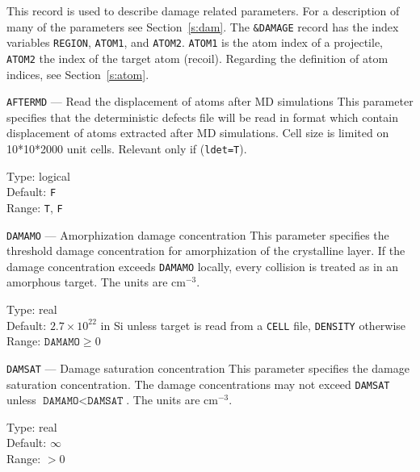 This record is used to describe damage related parameters. For a description of
many of the parameters see Section~\ref{s:dam}. The \texttt{\&DAMAGE} record has
the index variables \texttt{REGION}, \texttt{ATOM1}, and \texttt{ATOM2}.
\texttt{ATOM1} is the atom index of a projectile, \texttt{ATOM2} the index of the target atom
(recoil). Regarding the definition of atom indices, see Section~\ref{s:atom}.

\ifprivate
\begin{keydescription}{\texttt{AFTERMD} --- Read the displacement of atoms
after MD simulations}
%
  This parameter specifies that the deterministic defects file will be read 
  in format which contain displacement of atoms extracted after MD simulations. 
  Cell size  is limited on 10*10*2000 unit cells. Relevant only if  (\texttt{ldet=T}).
 
 \begin{keytab} 
 Type: \> logical \\ 
 Default: \> \texttt{F} \\ 
 Range: \>  \texttt{T}, \texttt{F}
  \end{keytab}
\end{keydescription}
\fi

\begin{keydescription}{\texttt{DAMAMO} --- Amorphization damage 
    concentration}
%
  This parameter specifies the threshold damage concentration for
  amorphization of the crystalline layer. If the damage concentration
  exceeds \texttt{DAMAMO} locally, every collision is treated as in an
  amorphous target. The units are cm$^{-3}$.
  \begin{keytab}
    Type:    \> real \\
    Default: \> $2.7 \times 10^{22}$ in Si unless target is read from a \texttt{CELL} file, 
                \texttt{DENSITY} otherwise \\
    Range:   \> $\texttt{DAMAMO} \ge 0$
  \end{keytab}
\end{keydescription}

\begin{keydescription}{\texttt{DAMSAT} --- Damage saturation concentration}
%
  This parameter specifies the damage saturation concentration. The damage
  concentrations may not exceed \texttt{DAMSAT} unless 
  $\texttt{DAMAMO} < \texttt{DAMSAT}$. The units are cm$^{-3}$.
  \begin{keytab}
    Type:    \> real \\
    Default: \> $\infty$ \\
    Range:   \> $> 0$ 
  \end{keytab}
\end{keydescription}

